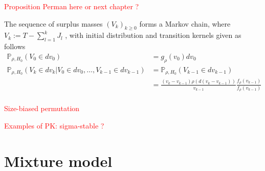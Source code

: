 \textcolor{red}{Proposition Perman here or next chapter ?}
\begin{proposition} \label{prop:perman}
The sequence of surplus masses $\left(V_k \right)_{k \ge 0}$ forms a Markov chain, where $V_k := T - \sum_{l=1}^k J_l$ , with initial distribution and transition kernels given as follows
\begin{equation*}
\begin{aligned}
\mathbb{P}_{\rho,H_0}(V_0 \in dv_0) &= g_\rho(v_0)dv_0 \\
\mathbb{P}_{\rho,H_0}(V_k \in dv_k|V_0 \in dv_0,\dots, V_{k-1} \in dv_{k-1}) &=  \mathbb{P}_{\rho,H_0}(V_{k-1} \in dv_{k-1})\\
&= \frac{(v_k-v_{k-1})\rho(d(v_k-v_{k-1}))}{v_{k-1}} \frac{f_\rho(v_{k-1})}{f_\rho(v_{k-1})} \\
\end{aligned}
\end{equation*}
\end{proposition}
\textcolor{red}{Size-biased permutation}


\textcolor{red}{Examples of PK: sigma-stable ?}


\section{Mixture model}
